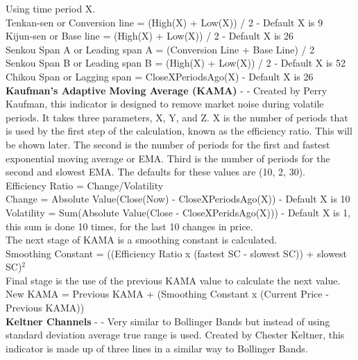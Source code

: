 \documentclass[12pt,a4paper]{article}
\begin{document}
\noindent
Using time period X.\\
Tenkan-sen or Conversion line = (High(X) + Low(X)) / 2  - Default X is 9 \\
Kijun-sen or Base line = (High(X) + Low(X)) / 2 - Default X is 26 \\
Senkou Span A or Leading span A = (Conversion Line + Base Line) / 2 \\
Senkou Span B or Leading span B = (High(X) + Low(X)) / 2 - Default X is 52 \\
Chikou Span or Lagging span = CloseXPeriodsAgo(X) - Default X is 26\\

\iffalse
[]
\fi

\noindent
\textbf{Kaufman's Adaptive Moving Average (KAMA)} - \cite{Kaufman1998} - Created by Perry Kaufman, this indicator is designed to remove market noise during volatile periods. It takes three parameters, X, Y, and Z. X is the number of periods that is used by the first step of the calculation, known as the efficiency ratio. This will be shown later. The second is the number of periods for the first and fastest exponential moving average or EMA. Third is the number of periods for the second and slowest EMA. The defaults for these values are (10, 2, 30). \\

\noindent
Efficiency Ratio = Change/Volatility\\
Change = Absolute Value(Close(Now) - CloseXPeriodsAgo(X)) - Default X is 10 \\
Volatility = Sum(Absolute Value(Close - CloseXPeridsAgo(X))) - Default X is 1, this sum is done 10 times, for the last 10 changes in price.\\

\noindent
The next stage of KAMA is a smoothing constant is calculated. \\

\noindent
Smoothing Constant = ((Efficiency Ratio x (fastest SC - slowest SC)) + slowest SC)$^2$\\

\noindent
Final stage is the use of the previous KAMA value to calculate the next value. \\

\noindent
New KAMA = Previous KAMA + (Smoothing Constant x (Current Price - Previous KAMA))\\

\iffalse
[]
\fi

\noindent
\textbf{Keltner Channels} - \cite{Keltner1960} - Very similar to Bollinger Bands but instead of using standard deviation average true range is used. Created by Chester Keltner, this indicator is made up of three lines in a similar way to Bollinger Bands.\\
\end{document}
